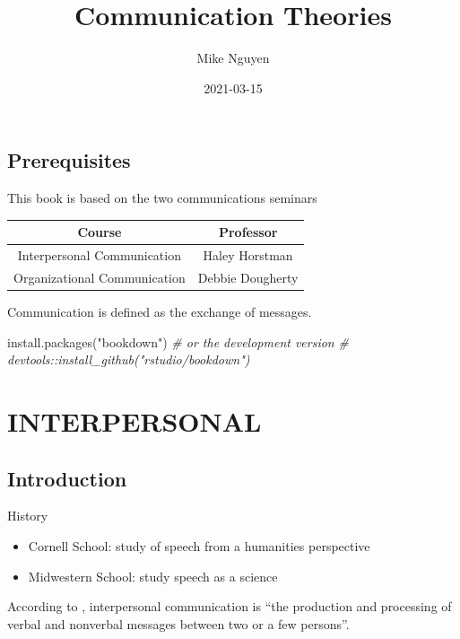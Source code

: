 \documentclass[
]{book}
\title{Communication Theories}
\author{Mike Nguyen}
\date{2021-03-15}
\newenvironment{Shaded}{\begin{snugshade}}{\end{snugshade}}
\newcommand{\CommentTok}[1]{\textcolor[rgb]{0.56,0.35,0.01}{\textit{#1}}}
\newcommand{\FunctionTok}[1]{\textcolor[rgb]{0.00,0.00,0.00}{#1}}
\newcommand{\NormalTok}[1]{#1}
\newcommand{\StringTok}[1]{\textcolor[rgb]{0.31,0.60,0.02}{#1}}
\providecommand{\tightlist}{%
  \setlength{\itemsep}{0pt}\setlength{\parskip}{0pt}}
\begin{document}
\maketitle

{
\setcounter{tocdepth}{1}
\tableofcontents
}
\hypertarget{prerequisites}{%
\chapter{Prerequisites}\label{prerequisites}}

This book is based on the two communications seminars

\begin{longtable}[]{@{}cc@{}}
\toprule
Course & Professor\tabularnewline
\midrule
\endhead
Interpersonal Communication & Haley Horstman\tabularnewline
Organizational Communication & Debbie Dougherty\tabularnewline
\bottomrule
\end{longtable}

Communication is defined as the exchange of messages.

\begin{Shaded}
\begin{Highlighting}[]
\FunctionTok{install.packages}\NormalTok{(}\StringTok{"bookdown"}\NormalTok{)}
\CommentTok{\# or the development version}
\CommentTok{\# devtools::install\_github("rstudio/bookdown")}
\end{Highlighting}
\end{Shaded}

\hypertarget{part-interpersonal}{%
\part{INTERPERSONAL}\label{part-interpersonal}}

\hypertarget{intro}{%
\chapter{Introduction}\label{intro}}

History

\begin{itemize}
\tightlist
\item
  Cornell School: study of speech from a humanities perspective
\item
  Midwestern School: study speech as a science
\end{itemize}

According to \citep{Baxter_2008}, interpersonal communication is ``the production and processing of verbal and nonverbal
messages between two or a few persons''.
\end{document}
